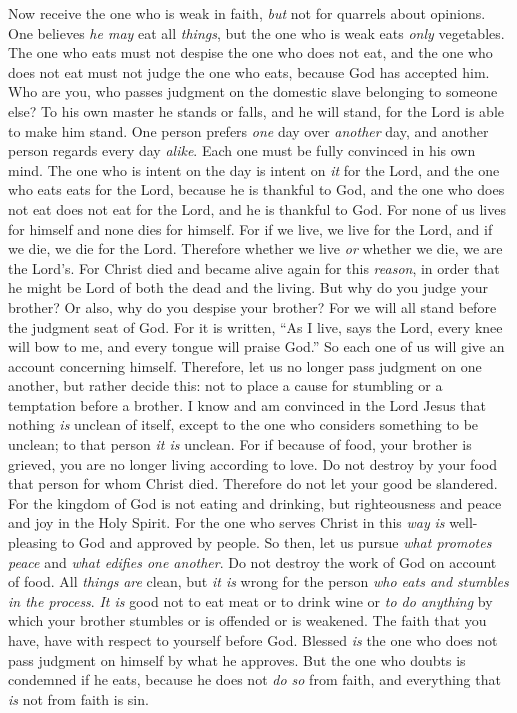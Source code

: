 \begin{biblechapter} %
 Now receive the one who is weak in faith, \textit{but} not for quarrels about opinions.
\verse One believes \textit{he may} eat all \textit{things}, but the one who is weak eats \textit{only} vegetables.
\verse The one who eats must not despise the one who does not eat, and the one who does not eat must not judge the one who eats, because God has accepted him.
\verse Who are you, who passes judgment on the domestic slave belonging to someone else? To his own master he stands or falls, and he will stand, for the Lord is able to make him stand.
\verse One person prefers \textit{one} day over \textit{another} day, and another person regards every day \textit{alike}. Each one must be fully convinced in his own mind.
\verse The one who is intent on the day is intent on \textit{it} for the Lord, and the one who eats eats for the Lord, because he is thankful to God, and the one who does not eat does not eat for the Lord, and he is thankful to God.
\verse For none of us lives for himself and none dies for himself.
\verse For if we live, we live for the Lord, and if we die, we die for the Lord. Therefore whether we live \textit{or} whether we die, we are the Lord’s.
\verse For Christ died and became alive again for this \textit{reason}, in order that he might be Lord of both the dead and the living.
\verse But why do you judge your brother? Or also, why do you despise your brother? For we will all stand before the judgment seat of God.
\verse For it is written, “As I live, says the Lord, every knee will bow to me, 
and every tongue will praise God.”
\verse So each one of us will give an account concerning himself.
\verse Therefore, let us no longer pass judgment on one another, but rather decide this: not to place a cause for stumbling or a temptation before a brother.
\verse I know and am convinced in the Lord Jesus that nothing \textit{is} unclean of itself, except to the one who considers something to be unclean; to that person \textit{it is} unclean.
\verse For if because of food, your brother is grieved, you are no longer living according to love. Do not destroy by your food that person for whom Christ died.
\verse Therefore do not let your good be slandered.
\verse For the kingdom of God is not eating and drinking, but righteousness and peace and joy in the Holy Spirit.
\verse For the one who serves Christ in this \textit{way} \textit{is} well-pleasing to God and approved by people.
\verse So then, let us pursue \textit{what promotes peace} and \textit{what edifies one another}.
\verse Do not destroy the work of God on account of food. All \textit{things} \textit{are} clean, but \textit{it is} wrong for the person \textit{who eats and stumbles in the process}.
\verse \textit{It is} good not to eat meat or to drink wine or \textit{to do anything} by which your brother stumbles or is offended or is weakened.
\verse The faith that you have, have with respect to yourself before God. Blessed \textit{is} the one who does not pass judgment on himself by what he approves.
\verse But the one who doubts is condemned if he eats, because he does not \textit{do so} from faith, and everything that \textit{is} not from faith is sin.
\end{biblechapter}
